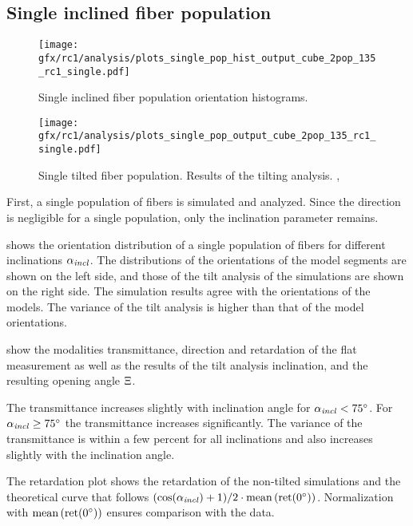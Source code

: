 \subsection{Single inclined fiber population}
\label{sec:resSingleIncl}
%
\begin{figure}[!t]
\centering
\texttt{[image: gfx/rc1/analysis/plots\_single\_pop\_hist\_output\_cube\_2pop\_135\_rc1\_single.pdf]}
\caption{Single inclined fiber population orientation histograms. }
\label{fig:single_fiber_pop_hist}
\end{figure}
%
\begin{figure}[!p]
\centering
\texttt{[image: gfx/rc1/analysis/plots\_single\_pop\_output\_cube\_2pop\_135\_rc1\_single.pdf]}
\caption{Single tilted fiber population. Results of the tilting analysis. , }
\label{fig:single_fiber_pop_rofl}
\end{figure}
%
First, a single population of fibers is simulated and analyzed.
Since the direction is negligible for a single population, only the inclination parameter \modelInc{} remains.
\par
%
 shows the orientation distribution of a single population of fibers for different inclinations $\textnormal{$\alpha_{\mathit{incl}}$}{}$.
The distributions of the orientations of the model segments are shown on the left side, and those of the tilt analysis of the simulations are shown on the right side.
The simulation results agree with the orientations of the models.
The variance of the tilt analysis is higher than that of the model orientations.
\par
%
 show the modalities transmittance, direction and retardation of the flat measurement as well as the results of the tilt analysis inclination, \trel{} and the resulting opening angle $\textnormal{$\Xi$}$.
\par
% 
The transmittance increases slightly with inclination angle for $\textnormal{$\alpha_{\mathit{incl}}$}<\SI{75}{\degree}$.
For $\textnormal{$\alpha_{\mathit{incl}}$} \ge \SI{75}{\degree}$ the transmittance increases significantly.
The variance of the transmittance is within a few percent for all inclinations and also increases slightly with the inclination angle.
\par
%
The retardation plot shows the retardation of the non-tilted simulations and the theoretical curve that follows $(\cos(\textnormal{$\alpha_{\mathit{incl}}$}) + 1) / 2 \cdot \operatorname{mean}\left(\mathrm{ret}(\SI{0}{\degree})\right)$.
Normalization with $\operatorname{mean}\left(\mathrm{ret}(\SI{0}{\degree})\right)$ ensures comparison with the data.
